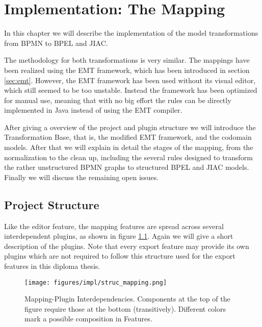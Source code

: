\chapter{Implementation: The Mapping}
\label{chapter:impl_mapping}

In this chapter we will describe the implementation of the model transformations from BPMN to BPEL and JIAC.

The methodology for both transformations is very similar. The mappings have been realized using the EMT framework, which has been introduced in section \ref{sec:emt}. However, the EMT framework has been used without its visual editor, which still seemed to be too unstable. Instead the framework has been optimized for manual use, meaning that with no big effort the rules can be directly implemented in Java instead of using the EMT compiler.

After giving a overview of the project and plugin structure we will introduce the Transformation Base, that is, the modified EMT framework, and the codomain models. After that we will explain in detail the stages of the mapping, from the normalization to the clean up, including the several rules designed to transform the rather unstructured BPMN graphs to structured BPEL and JIAC models. Finally we will discuss the remaining open issues.



\section{Project Structure}

Like the editor feature, the mapping features are spread across several interdependent plugins, as shown in figure \ref{fig:impl_struc_mapping}. Again we will give a short description of the plugins. Note that every export feature may provide its own plugins which are not required to follow this structure used for the export features in this diploma thesis.

\begin{figure}[htp]
	\centering
	\texttt{[image: figures/impl/struc\_mapping.png]}
	\caption[Mapping-Plugin Interdependencies]{Mapping-Plugin Interdependencies. Components at the top of the figure require those at the bottom (transitively). Different colors mark a possible composition in Features.}
	\label{fig:impl_struc_mapping}
\end{figure}

